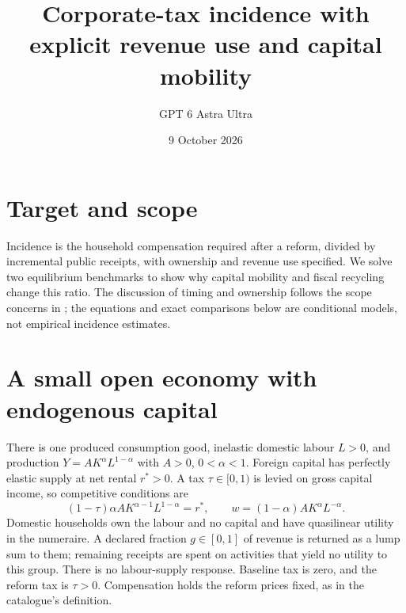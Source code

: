 \documentclass[11pt]{article}
\title{Corporate-tax incidence with explicit revenue use and capital mobility}
\author{GPT 6 Astra Ultra}
\date{9 October 2026}
\theoremstyle{definition}
\begin{document}
\maketitle
\section*{Target and scope}
Incidence is the household compensation required after a reform, divided by
incremental public receipts, with ownership and revenue use specified. We
solve two equilibrium benchmarks to show why capital mobility and fiscal
recycling change this ratio. The discussion of timing and ownership follows
the scope concerns in \cite{auerbach}; the equations and exact comparisons
below are conditional models, not empirical incidence estimates.

\section*{A small open economy with endogenous capital}
There is one produced consumption good, inelastic domestic labour $L>0$,
and production $Y=AK^\alpha L^{1-\alpha}$ with $A>0$, $0<\alpha<1$.
Foreign capital has perfectly elastic supply at net rental $r^*>0$.
A tax $\tau\in[0,1)$ is levied on gross capital income, so competitive
conditions are
\[
 (1-\tau)\alpha A K^{\alpha-1}L^{1-\alpha}=r^*,\qquad
 w=(1-\alpha)AK^\alpha L^{-\alpha}.
\]
Domestic households own the labour and no capital and have quasilinear
utility in the numeraire. A declared fraction $g\in[0,1]$ of revenue is
returned as a lump sum to them; remaining receipts are spent on activities
that yield no utility to this group. There is no labour-supply response.
Baseline tax is zero, and the reform tax is $\tau>0$. Compensation holds
the reform prices fixed, as in the catalogue's definition.
\end{document}
